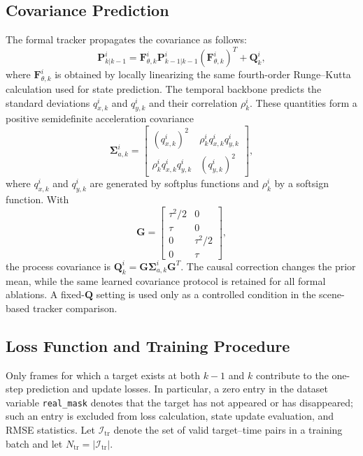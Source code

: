 \documentclass[10pt,doublecolumn]{IEEEtaes}
\begin{document}
\subsection{Covariance Prediction}
The formal tracker propagates the covariance as follows:
\begin{equation}
\mathbf{P}_{k|k-1}^{i}=\mathbf F_{\theta,k}^{i}
\mathbf{P}_{k-1|k-1}^{i}(\mathbf F_{\theta,k}^{i})^{T}+\mathbf{Q}_{k}^{i},
\label{eq:covariance_prediction}
\end{equation}
where \(\mathbf F_{\theta,k}^{i}\) is obtained by locally linearizing the same fourth-order Runge--Kutta calculation used for state prediction.
The temporal backbone predicts the standard deviations $q_{x,k}^{i}$ and $q_{y,k}^{i}$ and their correlation $\rho_k^i$. These quantities form a positive semidefinite acceleration covariance
\begin{equation}
\boldsymbol{\Sigma}_{a,k}^{i}=
\begin{bmatrix}
(q_{x,k}^{i})^2&\rho_k^iq_{x,k}^{i}q_{y,k}^{i}\\
\rho_k^iq_{x,k}^{i}q_{y,k}^{i}&(q_{y,k}^{i})^2
\end{bmatrix},
\end{equation}
where $q_{x,k}^{i}$ and $q_{y,k}^{i}$ are generated by softplus functions and $\rho_k^i$ by a softsign function. With
\begin{equation}
\mathbf{G}=\begin{bmatrix}\tau^2/2&0\\\tau&0\\0&\tau^2/2\\0&\tau\end{bmatrix},
\end{equation}
the process covariance is $\mathbf{Q}_{k}^{i}=\mathbf{G}\boldsymbol{\Sigma}_{a,k}^{i}\mathbf{G}^{T}$. The causal correction changes the prior mean, while the same learned covariance protocol is retained for all formal ablations. A fixed-$\mathbf{Q}$ setting is used only as a controlled condition in the scene-based tracker comparison.

\subsection{Loss Function and Training Procedure}

Only frames for which a target exists at both $k-1$ and $k$ contribute to the one-step prediction and update losses. In particular, a zero entry in the dataset variable \texttt{real\_mask} denotes that the target has not appeared or has disappeared; such an entry is excluded from loss calculation, state update evaluation, and RMSE statistics. Let $\mathcal{I}_{\mathrm{tr}}$ denote the set of valid target--time pairs in a training batch and let $N_{\mathrm{tr}}=|\mathcal{I}_{\mathrm{tr}}|$.
\end{document}
